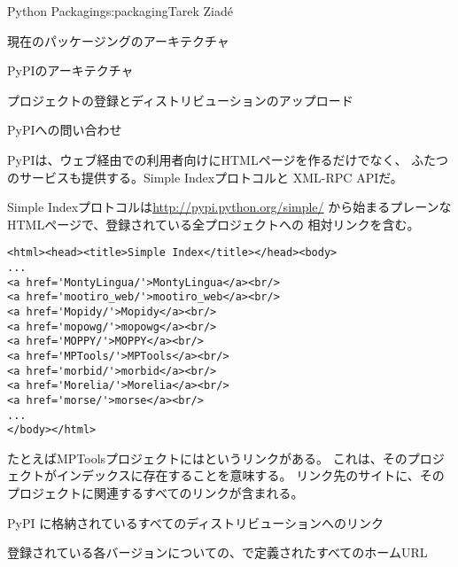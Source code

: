 \begin{aosachapter}{Python Packaging}{s:packaging}{Tarek Ziad\'{e}}
\begin{aosasect1}{現在のパッケージングのアーキテクチャ}
\begin{aosasect2}{PyPIのアーキテクチャ}
\begin{aosasect3}{プロジェクトの登録とディストリビューションのアップロード}
\end{aosasect3}

\begin{aosasect3}{PyPIへの問い合わせ}

PyPIは、ウェブ経由での利用者向けにHTMLページを作るだけでなく、
ふたつのサービスも提供する。Simple Indexプロトコルと
XML-RPC APIだ。

Simple Indexプロトコルは\url{http://pypi.python.org/simple/}
から始まるプレーンなHTMLページで、登録されている全プロジェクトへの
相対リンクを含む。

\begin{verbatim}
<html><head><title>Simple Index</title></head><body>
...
<a href='MontyLingua/'>MontyLingua</a><br/>
<a href='mootiro_web/'>mootiro_web</a><br/>
<a href='Mopidy/'>Mopidy</a><br/>
<a href='mopowg/'>mopowg</a><br/>
<a href='MOPPY/'>MOPPY</a><br/>
<a href='MPTools/'>MPTools</a><br/>
<a href='morbid/'>morbid</a><br/>
<a href='Morelia/'>Morelia</a><br/>
<a href='morse/'>morse</a><br/>
...
</body></html>
\end{verbatim}

\noindent
たとえばMPToolsプロジェクトにはというリンクがある。
これは、そのプロジェクトがインデックスに存在することを意味する。
リンク先のサイトに、そのプロジェクトに関連するすべてのリンクが含まれる。

\begin{aosaitemize}

  \item PyPI に格納されているすべてのディストリビューションへのリンク

  \item 登録されている各バージョンについての、で定義されたすべてのホームURL


\end{aosaitemize}
\end{aosasect3}
\end{aosasect2}
\end{aosasect1}
\end{aosachapter}
